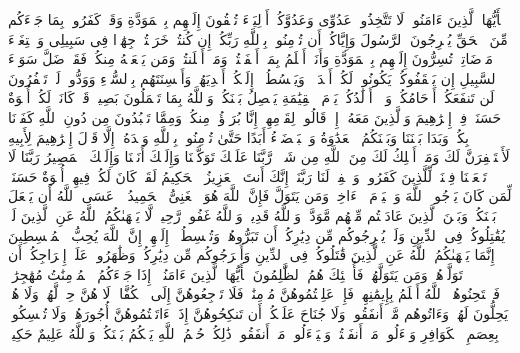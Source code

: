 \startbuffer[\q:60:1]
یَٰۤأَیُّهَا ٱلَّذِینَ ءَامَنُوا۟ لَا تَتَّخِذُوا۟ عَدُوِّی وَعَدُوَّكُمۡ أَوۡلِیَاۤءَ تُلۡقُونَ إِلَیۡهِم بِٱلۡمَوَدَّةِ وَقَدۡ كَفَرُوا۟ بِمَا جَاۤءَكُم مِّنَ ٱلۡحَقِّ یُخۡرِجُونَ ٱلرَّسُولَ وَإِیَّاكُمۡ أَن تُؤۡمِنُوا۟ بِٱللَّهِ رَبِّكُمۡ إِن كُنتُمۡ خَرَجۡتُمۡ جِهَٰدࣰا فِی سَبِیلِی وَٱبۡتِغَاۤءَ مَرۡضَاتِیۚ تُسِرُّونَ إِلَیۡهِم بِٱلۡمَوَدَّةِ وَأَنَا۠ أَعۡلَمُ بِمَاۤ أَخۡفَیۡتُمۡ وَمَاۤ أَعۡلَنتُمۡۚ وَمَن یَفۡعَلۡهُ مِنكُمۡ فَقَدۡ ضَلَّ سَوَاۤءَ ٱلسَّبِیلِ%
\stopbuffer
\startbuffer[\q:60:2]
إِن یَثۡقَفُوكُمۡ یَكُونُوا۟ لَكُمۡ أَعۡدَاۤءࣰ وَیَبۡسُطُوۤا۟ إِلَیۡكُمۡ أَیۡدِیَهُمۡ وَأَلۡسِنَتَهُم بِٱلسُّوۤءِ وَوَدُّوا۟ لَوۡ تَكۡفُرُونَ%
\stopbuffer
\startbuffer[\q:60:3]
لَن تَنفَعَكُمۡ أَرۡحَامُكُمۡ وَلَاۤ أَوۡلَٰدُكُمۡۚ یَوۡمَ ٱلۡقِیَٰمَةِ یَفۡصِلُ بَیۡنَكُمۡۚ وَٱللَّهُ بِمَا تَعۡمَلُونَ بَصِیرࣱ%
\stopbuffer
\startbuffer[\q:60:4]
قَدۡ كَانَتۡ لَكُمۡ أُسۡوَةٌ حَسَنَةࣱ فِیۤ إِبۡرَٰهِیمَ وَٱلَّذِینَ مَعَهُۥۤ إِذۡ قَالُوا۟ لِقَوۡمِهِمۡ إِنَّا بُرَءَٰۤؤُا۟ مِنكُمۡ وَمِمَّا تَعۡبُدُونَ مِن دُونِ ٱللَّهِ كَفَرۡنَا بِكُمۡ وَبَدَا بَیۡنَنَا وَبَیۡنَكُمُ ٱلۡعَدَٰوَةُ وَٱلۡبَغۡضَاۤءُ أَبَدًا حَتَّىٰ تُؤۡمِنُوا۟ بِٱللَّهِ وَحۡدَهُۥۤ إِلَّا قَوۡلَ إِبۡرَٰهِیمَ لِأَبِیهِ لَأَسۡتَغۡفِرَنَّ لَكَ وَمَاۤ أَمۡلِكُ لَكَ مِنَ ٱللَّهِ مِن شَیۡءࣲۖ رَّبَّنَا عَلَیۡكَ تَوَكَّلۡنَا وَإِلَیۡكَ أَنَبۡنَا وَإِلَیۡكَ ٱلۡمَصِیرُ%
\stopbuffer
\startbuffer[\q:60:5]
رَبَّنَا لَا تَجۡعَلۡنَا فِتۡنَةࣰ لِّلَّذِینَ كَفَرُوا۟ وَٱغۡفِرۡ لَنَا رَبَّنَاۤۖ إِنَّكَ أَنتَ ٱلۡعَزِیزُ ٱلۡحَكِیمُ%
\stopbuffer
\startbuffer[\q:60:6]
لَقَدۡ كَانَ لَكُمۡ فِیهِمۡ أُسۡوَةٌ حَسَنَةࣱ لِّمَن كَانَ یَرۡجُوا۟ ٱللَّهَ وَٱلۡیَوۡمَ ٱلۡءَاخِرَۚ وَمَن یَتَوَلَّ فَإِنَّ ٱللَّهَ هُوَ ٱلۡغَنِیُّ ٱلۡحَمِیدُ%
\stopbuffer
\startbuffer[\q:60:7]
۞ عَسَى ٱللَّهُ أَن یَجۡعَلَ بَیۡنَكُمۡ وَبَیۡنَ ٱلَّذِینَ عَادَیۡتُم مِّنۡهُم مَّوَدَّةࣰۚ وَٱللَّهُ قَدِیرࣱۚ وَٱللَّهُ غَفُورࣱ رَّحِیمࣱ%
\stopbuffer
\startbuffer[\q:60:8]
لَّا یَنۡهَىٰكُمُ ٱللَّهُ عَنِ ٱلَّذِینَ لَمۡ یُقَٰتِلُوكُمۡ فِی ٱلدِّینِ وَلَمۡ یُخۡرِجُوكُم مِّن دِیَٰرِكُمۡ أَن تَبَرُّوهُمۡ وَتُقۡسِطُوۤا۟ إِلَیۡهِمۡۚ إِنَّ ٱللَّهَ یُحِبُّ ٱلۡمُقۡسِطِینَ%
\stopbuffer
\startbuffer[\q:60:9]
إِنَّمَا یَنۡهَىٰكُمُ ٱللَّهُ عَنِ ٱلَّذِینَ قَٰتَلُوكُمۡ فِی ٱلدِّینِ وَأَخۡرَجُوكُم مِّن دِیَٰرِكُمۡ وَظَٰهَرُوا۟ عَلَىٰۤ إِخۡرَاجِكُمۡ أَن تَوَلَّوۡهُمۡۚ وَمَن یَتَوَلَّهُمۡ فَأُو۟لَٰۤئِكَ هُمُ ٱلظَّٰلِمُونَ%
\stopbuffer
\startbuffer[\q:60:10]
یَٰۤأَیُّهَا ٱلَّذِینَ ءَامَنُوۤا۟ إِذَا جَاۤءَكُمُ ٱلۡمُؤۡمِنَٰتُ مُهَٰجِرَٰتࣲ فَٱمۡتَحِنُوهُنَّۖ ٱللَّهُ أَعۡلَمُ بِإِیمَٰنِهِنَّۖ فَإِنۡ عَلِمۡتُمُوهُنَّ مُؤۡمِنَٰتࣲ فَلَا تَرۡجِعُوهُنَّ إِلَى ٱلۡكُفَّارِۖ لَا هُنَّ حِلࣱّ لَّهُمۡ وَلَا هُمۡ یَحِلُّونَ لَهُنَّۖ وَءَاتُوهُم مَّاۤ أَنفَقُوا۟ۚ وَلَا جُنَاحَ عَلَیۡكُمۡ أَن تَنكِحُوهُنَّ إِذَاۤ ءَاتَیۡتُمُوهُنَّ أُجُورَهُنَّۚ وَلَا تُمۡسِكُوا۟ بِعِصَمِ ٱلۡكَوَافِرِ وَسۡءَلُوا۟ مَاۤ أَنفَقۡتُمۡ وَلۡیَسۡءَلُوا۟ مَاۤ أَنفَقُوا۟ۚ ذَٰلِكُمۡ حُكۡمُ ٱللَّهِ یَحۡكُمُ بَیۡنَكُمۡۖ وَٱللَّهُ عَلِیمٌ حَكِیمࣱ%
